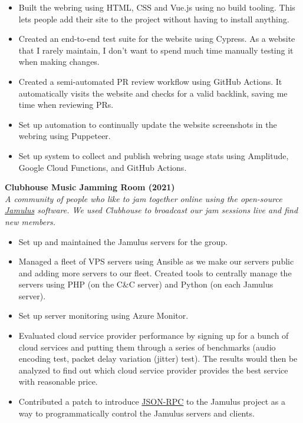 \documentclass[a4paper]{article}
\begin{document}
\begin{itemize} \itemsep 1pt
    
	\item Built the webring using HTML, CSS and Vue.js using no build tooling. This lets people add their site to the project without having to install anything.
    
	\item Created an end-to-end test suite for the website using Cypress. As a website that I rarely maintain, I don’t want to spend much time manually testing it when making changes.
    
	\item Created a semi-automated PR review workflow using GitHub Actions. It automatically visits the website and checks for a valid backlink, saving me time when reviewing PRs.
    
	\item Set up automation to continually update the website screenshots in the webring using Puppeteer.
    
	\item Set up system to collect and publish webring usage stats using Amplitude, Google Cloud Functions, and GitHub Actions.
    
\end{itemize}

\vspace{2mm}

\textbf{Clubhouse Music Jamming Room (2021)}\\
\textit{A community of people who like to jam together online using the open-source \href{https://jamulus.io/}{Jamulus} software. We used Clubhouse to broadcast our jam sessions live and find new members.}

\begin{itemize} \itemsep 1pt
    
	\item Set up and maintained the Jamulus servers for the group.
    
	\item Managed a fleet of VPS servers using Ansible as we make our servers public and adding more servers to our fleet. Created tools to centrally manage the servers using PHP (on the C\&C server) and Python (on each Jamulus server).
    
	\item Set up server monitoring using Azure Monitor.
    
	\item Evaluated cloud service provider performance by signing up for a bunch of cloud services and putting them through a series of benchmarks (audio encoding test, packet delay variation (jitter) test). The results would then be analyzed to find out which cloud service provider provides the best service with reasonable price.
    
	\item Contributed a patch to introduce \href{https://github.com/jamulussoftware/jamulus/pull/1975}{JSON-RPC} to the Jamulus project as a way to programmatically control the Jamulus servers and clients.
    
\end{itemize}
\end{document}
